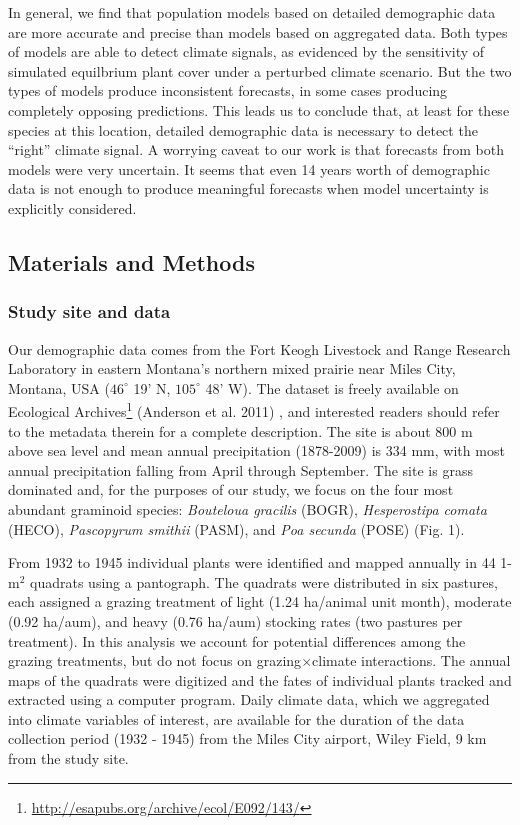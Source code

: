 \documentclass[12pt,]{article}
\begin{document}
In general, we find that population models based on detailed demographic
data are more accurate and precise than models based on aggregated data.
Both types of models are able to detect climate signals, as evidenced by
the sensitivity of simulated equilbrium plant cover under a perturbed
climate scenario. But the two types of models produce inconsistent
forecasts, in some cases producing completely opposing predictions. This
leads us to conclude that, at least for these species at this location,
detailed demographic data is necessary to detect the ``right'' climate
signal. A worrying caveat to our work is that forecasts from both models
were very uncertain. It seems that even 14 years worth of demographic
data is not enough to produce meaningful forecasts when model
uncertainty is explicitly considered.

\subsection{Materials and Methods}\label{materials-and-methods}

\subsubsection{Study site and data}\label{study-site-and-data}

Our demographic data comes from the Fort Keogh Livestock and Range
Research Laboratory in eastern Montana's northern mixed prairie near
Miles City, Montana, USA ($46^{\circ}$ 19' N, $105^{\circ}$ 48' W). The
dataset is freely available on Ecological Archives\footnote{\url{http://esapubs.org/archive/ecol/E092/143/}}
(Anderson et al. 2011) , and interested readers should refer to the
metadata therein for a complete description. The site is about 800 m
above sea level and mean annual precipitation (1878-2009) is 334 mm,
with most annual precipitation falling from April through September. The
site is grass dominated and, for the purposes of our study, we focus on
the four most abundant graminoid species: \emph{Bouteloua gracilis}
(BOGR), \emph{Hesperostipa comata} (HECO), \emph{Pascopyrum smithii}
(PASM), and \emph{Poa secunda} (POSE) (Fig. 1).

From 1932 to 1945 individual plants were identified and mapped annually
in 44 1-$\text{m}^2$ quadrats using a pantograph. The quadrats were
distributed in six pastures, each assigned a grazing treatment of light
(1.24 ha/animal unit month), moderate (0.92 ha/aum), and heavy (0.76
ha/aum) stocking rates (two pastures per treatment). In this analysis we
account for potential differences among the grazing treatments, but do
not focus on grazing$\times$climate interactions. The annual maps of the
quadrats were digitized and the fates of individual plants tracked and
extracted using a computer program. Daily climate data, which we
aggregated into climate variables of interest, are available for the
duration of the data collection period (1932 - 1945) from the Miles City
airport, Wiley Field, 9 km from the study site.
\end{document}
